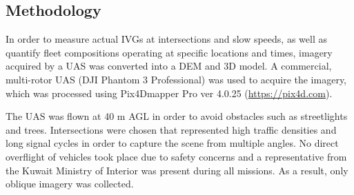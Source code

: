\documentclass[preprint,12pt,a4paper,authoryear]{elsarticle}
\begin{document}
\begin{linenumbers}
\begin{table}[H]
\centering
\caption[Vehicle density sample]{Sample of an iteration showing vehicle class and road space selection for speed = 5 kph.}
\label{tb3:selection}
\end{table}


\section{Methodology}

In order to measure actual IVGs at intersections and slow speeds, as well as quantify fleet compositions operating at specific locations and times, imagery acquired by a UAS was converted into a DEM and 3D model. A commercial, multi-rotor UAS (DJI Phantom 3 Professional) was used to acquire the imagery, which was processed using Pix4Dmapper Pro ver 4.0.25 (\url{https://pix4d.com}).

The UAS was flown at 40 m AGL in order to avoid obstacles such as streetlights and trees. Intersections were chosen that represented high traffic densities and long signal cycles in order to capture the scene from multiple angles. No direct overflight of vehicles took place due to safety concerns and a representative from the Kuwait Ministry of Interior was present during all missions. As a result, only oblique imagery was collected. 


\end{linenumbers}
\end{document}
